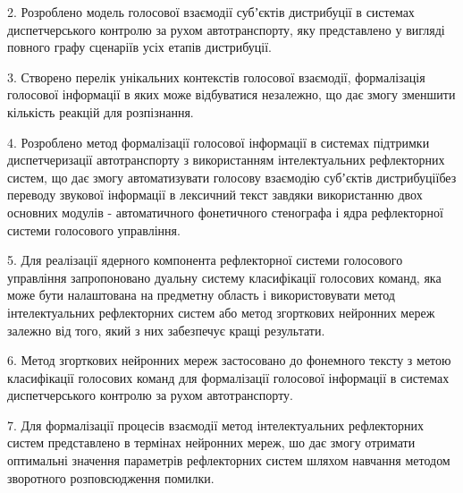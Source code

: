2. Розроблено модель голосової взаємодії субʼєктів дистрибуції в системах диспетчерського контролю за рухом автотранспорту, яку представлено у вигляді повного графу сценаріїв усіх етапів дистрибуції.

3. Створено перелік унікальних контекстів голосової взаємодії, формалізація голосової інформації в яких може відбуватися незалежно, що дає змогу зменшити кількість реакцій для розпізнання.

4. Розроблено метод формалізації голосової інформації в системах підтримки диспетчеризації автотранспорту з використанням інтелектуальних рефлекторних систем, що дає змогу автоматизувати голосову взаємодію субʼєктів дистрибуціїбез переводу звукової інформації в лексичний текст завдяки використанню двох основних модулів - автоматичного фонетичного стенографа і ядра рефлекторної системи голосового управління.

5. Для реалізації ядерного компонента рефлекторної системи голосового управління запропоновано дуальну систему класифікації голосових команд, яка може бути налаштована на предметну область і використовувати метод інтелектуальних рефлекторних систем або метод згорткових нейронних мереж залежно від того, який з них забезпечує кращі результати.

6. Метод згорткових нейронних мереж застосовано до фонемного тексту з метою класифікації голосових команд для формалізації голосової інформації в системах диспетчерського контролю за рухом автотранспорту.

7. Для формалізації процесів взаємодії метод інтелектуальних рефлекторних систем представлено в термінах нейронних мереж, шо дає змогу отримати оптимальні значення параметрів рефлекторних систем шляхом навчання методом зворотного розповсюдження помилки.